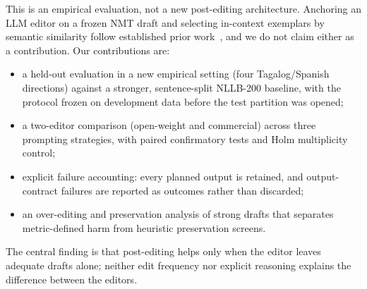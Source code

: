 This is an empirical evaluation, not a new post-editing architecture. Anchoring an LLM editor on a frozen NMT draft and selecting in-context exemplars by semantic similarity follow established prior work~\cite{ahmadnia2026icai,vilar2023}, and we do not claim either as a contribution. Our contributions are:
\begin{itemize}
\item a held-out evaluation in a new empirical setting (four Tagalog/Spanish directions) against a stronger, sentence-split NLLB-200 baseline, with the protocol frozen on development data before the test partition was opened;
\item a two-editor comparison (open-weight and commercial) across three prompting strategies, with paired confirmatory tests and Holm multiplicity control;
\item explicit failure accounting: every planned output is retained, and output-contract failures are reported as outcomes rather than discarded;
\item an over-editing and preservation analysis of strong drafts that separates metric-defined harm from heuristic preservation screens.
\end{itemize}
The central finding is that post-editing helps only when the editor leaves adequate drafts alone; neither edit frequency nor explicit reasoning explains the difference between the editors.
